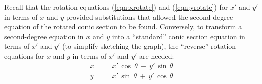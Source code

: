 
Recall that the rotation equations (\ref{eqn:xrotate}) and (\ref{eqn:yrotate})
for $x'$ and $y'$ in terms of $x$ and $y$ provided substitutions that allowed
the second-degree equation of the rotated conic section to be found. Conversely,
to transform a second-degree equation in $x$ and $y$ into a ``standard'' conic
section equation in terms of $x'$ and $y'$ (to simplify sketching the graph),
the ``reverse'' rotation equations for $x$ and $y$ in terms of $x'$ and $y'$ are
needed:
\begin{align}
x ~&=~ x'\,\cos\,\theta ~-~ y'\,\sin\,\theta\label{eqn:xprotate}\\
y ~&=~ x'\,\sin\,\theta ~+~ y'\,\cos\,\theta\label{eqn:yprotate}
\end{align}

